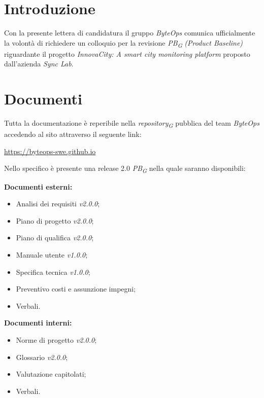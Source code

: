 \documentclass{article}
\begin{document}
\flushleft

\section{Introduzione}
Con la presente lettera di candidatura il gruppo \textit{ByteOps} comunica ufficialmente la volontà di richiedere un colloquio per la revisione \textit{PB}\textsubscript{\textit{G}} \textit{(Product Baseline)} riguardante il progetto \textit{InnovaCity: A smart city monitoring platform} proposto dall'azienda \textit{Sync Lab}.

\section{Documenti}
Tutta la documentazione è reperibile nella \textit{repository}\textsubscript{\textit{G}} pubblica del team \textit{ByteOps} accedendo al sito attraverso il seguente link:

\begin{center}
    \href{https://byteops-swe.github.io}{https://byteops-swe.github.io}
\end{center}

Nello specifico è presente una release 2.0 \textit{PB}\textsubscript{\textit{G}} nella quale saranno disponibili:
\vspace{0.2cm}

\textbf{Documenti esterni:}
\begin{itemize}
    \item Analisi dei requisiti \textit{v2.0.0};
    \item Piano di progetto \textit{v2.0.0};
    \item Piano di qualifica \textit{v2.0.0};
    \item Manuale utente \textit{v1.0.0};
    \item Specifica tecnica \textit{v1.0.0};
    \item Preventivo costi e assunzione impegni;
    \item Verbali.
\end{itemize}
\vspace{0.2cm}

\textbf{Documenti interni:}
\begin{itemize}
    \item Norme di progetto \textit{v2.0.0};
    \item Glossario \textit{v2.0.0};
    \item Valutazione capitolati;
    \item Verbali.
\end{itemize}
\end{document}
